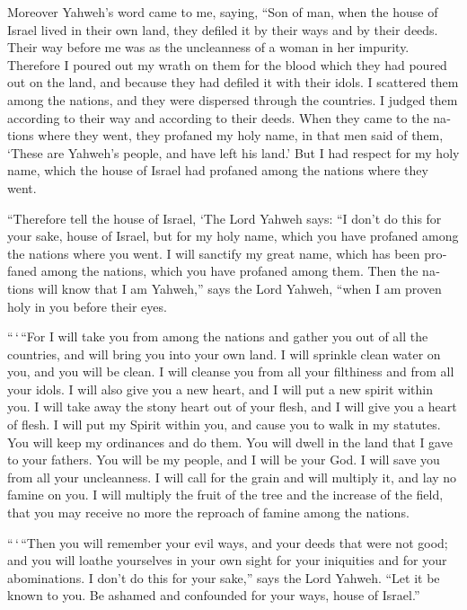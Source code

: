 \begin{paracol}{2}
\begin{otherlanguage}{english}
 Moreover Yahweh's word came to me, saying,
 ``Son of man, when the house of Israel lived in their
own land, they defiled it by their ways and by their deeds. Their way
before me was as the uncleanness of a woman in her impurity.
 Therefore I poured out my wrath on them for the blood
which they had poured out on the land, and because they had defiled it
with their idols.  I scattered them among the nations,
and they were dispersed through the countries. I judged them according
to their way and according to their deeds.  When they
came to the nations where they went, they profaned my holy name, in that
men said of them, `These are Yahweh's people, and have left his land.'
 But I had respect for my holy name, which the house of
Israel had profaned among the nations where they went.

 ``Therefore tell the house of Israel, `The Lord Yahweh
says: ``I don't do this for your sake, house of Israel, but for my holy
name, which you have profaned among the nations where you went.
 I will sanctify my great name, which has been profaned
among the nations, which you have profaned among them. Then the nations
will know that I am Yahweh,'' says the Lord Yahweh, ``when I am proven
holy in you before their eyes.

 ``\,`\,``For I will take you from among the nations and
gather you out of all the countries, and will bring you into your own
land.  I will sprinkle clean water on you, and you will
be clean. I will cleanse you from all your filthiness and from all your
idols.  I will also give you a new heart, and I will put
a new spirit within you. I will take away the stony heart out of your
flesh, and I will give you a heart of flesh.  I will put
my Spirit within you, and cause you to walk in my statutes. You will
keep my ordinances and do them.  You will dwell in the
land that I gave to your fathers. You will be my people, and I will be
your God.  I will save you from all your uncleanness. I
will call for the grain and will multiply it, and lay no famine on you.
 I will multiply the fruit of the tree and the increase
of the field, that you may receive no more the reproach of famine among
the nations.

 ``\,`\,``Then you will remember your evil ways, and your
deeds that were not good; and you will loathe yourselves in your own
sight for your iniquities and for your abominations.  I
don't do this for your sake,'' says the Lord Yahweh. ``Let it be known
to you. Be ashamed and confounded for your ways, house of Israel.''


\end{otherlanguage}
\end{paracol}
